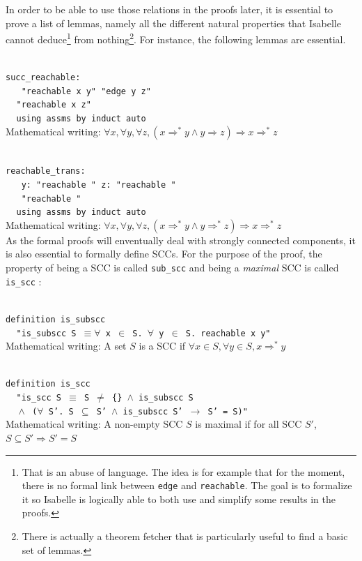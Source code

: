 \documentclass[a4 paper, 12pt]{article}
\newcommand{\lm}{{\color{isa_blue}{lemma}}}
\newcommand{\where}{{\color{isa_green}{where}}}
\renewcommand{\and}{{\color{isa_green}{and}}}
\newcommand{\assumes}{{\color{isa_green}{assumes}}}
\newcommand{\shows}{{\color{isa_green}{shows}}}
\newcommand{\isa}[1]{\small\texttt{\\\noindent#1}}
\newcommand{\blue}[1]{{\color{isa_dark_blue}{#1}}}
\theoremstyle{definition}
\begin{document}
In order to be able to use those relations in the proofs later, it is essential to prove a list of lemmas, namely all the different natural properties that Isabelle cannot deduce\footnote{That is an abuse of language. The idea is for example that for the moment, there is no formal link between \texttt{edge} and \texttt{reachable}. The goal is to formalize it so Isabelle is logically able to both use and simplify some results in the proofs.} from nothing\footnote{There is actually a theorem fetcher that is particularly useful to find a basic set of lemmas.}. For instance, the following lemmas are essential.

\isa{
\lm{} succ\_reachable:\\
$~~~~~$\assumes{} "reachable {\color{isa_dark_blue}x y}" \and{} "edge {\color{isa_dark_blue}y z}"\\
$~~~~~$\shows "reachable {\color{isa_dark_blue}x z}"\\
$~~~~~${\color{isa_blue}using} assms {\color{isa_blue}by} induct auto\\
}
Mathematical writing: $\forall x, \forall y, \forall z, (x \Rightarrow^* y \wedge y \Rightarrow z) \Longrightarrow x \Rightarrow^* z$

\isa{
\lm{} reachable\_trans:\\
$~~~~~$\assumes{} y: "reachable \blue{x y}" \and{} z: "reachable \blue{y z}"\\
$~~~~~$\shows{} "reachable \blue{x z}"\\
$~~~~~${\color{isa_blue}using} assms {\color{isa_blue}by} induct auto\\
}
Mathematical writing: $\forall x, \forall y, \forall z, (x \Rightarrow^* y \wedge y \Rightarrow^* z) \Longrightarrow x \Rightarrow^* z$\\

As the formal proofs will enventually deal with strongly connected components, it is also essential to formally define SCCs. For the purpose of the proof, the property of being a SCC is called \texttt{sub\_scc} and being a \textit{maximal} SCC is called \texttt{is\_scc} :

\isa{
{\color{isa_blue}definition} is\_subscc \where\\
$~~~~~$"is\_subscc S $\equiv \forall$ x $\in$ S. $\forall$ y $\in$ S. reachable x y"\\
}
Mathematical writing: A set $S$ is a SCC if $\forall x \in S, \forall y \in S, x \Rightarrow^* y$

\isa{
{\color{isa_blue}definition} is\_scc \where\\
$~~~~~$"is\_scc S $\equiv$ S $\neq$ \{\} $\wedge$ is\_subscc S\\
$~~~~~\wedge$ ($\forall$ S'. S $\subseteq$ S' $\wedge$ is\_subscc S' $\longrightarrow$ S' = S)"\\
}
Mathematical writing: A non-empty SCC $S$ is maximal if for all SCC $S'$, $S \subseteq S' \Longrightarrow S'=S$\\
\end{document}
